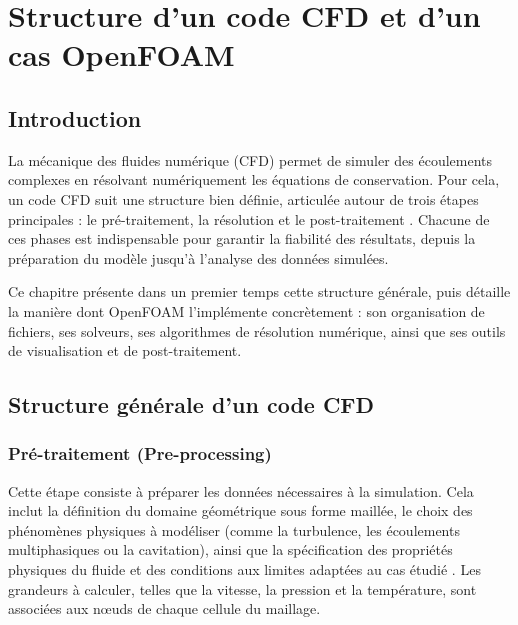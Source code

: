 \chapter{Structure d'un code CFD et d'un cas OpenFOAM}
\label{chap:structure_cfd_openfoam}

\section{Introduction}
\label{sec:introduction_structure_cfd_openfoam}

La mécanique des fluides numérique (CFD) permet de simuler des écoulements complexes en résolvant numériquement les équations de conservation. Pour cela, un code CFD suit une structure bien définie, articulée autour de trois étapes principales : le pré-traitement, la résolution et le post-traitement \cite{wendt2009computational}. Chacune de ces phases est indispensable pour garantir la fiabilité des résultats, depuis la préparation du modèle jusqu'à l'analyse des données simulées.

Ce chapitre présente dans un premier temps cette structure générale, puis détaille la manière dont OpenFOAM l'implémente concrètement : son organisation de fichiers, ses solveurs, ses algorithmes de résolution numérique, ainsi que ses outils de visualisation et de post-traitement.

\section{Structure générale d'un code CFD}
\label{sec:structure_generale_code_cfd}

\subsection{Pré-traitement (Pre-processing)}
\label{subsec:preprocessing}

Cette étape consiste à préparer les données nécessaires à la simulation. Cela inclut la définition du domaine géométrique sous forme maillée, le choix des phénomènes physiques à modéliser (comme la turbulence, les écoulements multiphasiques ou la cavitation), ainsi que la spécification des propriétés physiques du fluide et des conditions aux limites adaptées au cas étudié \cite{thompson1999handbook}. Les grandeurs à calculer, telles que la vitesse, la pression et la température, sont associées aux nœuds de chaque cellule du maillage.

